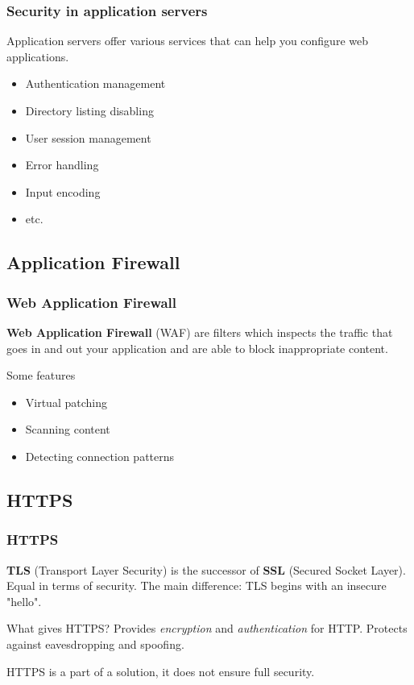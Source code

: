 \begin{frame}
\frametitle{Security in application servers}
Application servers offer various services that can help you configure
web applications.

\begin{itemize}
\item Authentication management
\item Directory listing disabling
\item User session management
\item Error handling
\item Input encoding
\item etc.
\end{itemize}
\end{frame}

\subsection{Application Firewall}

\begin{frame}
\frametitle{Web Application Firewall}
\textbf{Web Application Firewall} (WAF) are filters which inspects the traffic
that goes in and out your application and are able to block inappropriate
content.

\begin{block}{Some features}
\begin{itemize}
\item Virtual patching
\item Scanning content
\item Detecting connection patterns
\end{itemize}
\end{block}
\end{frame}

\subsection{HTTPS}

\begin{frame}
\frametitle{HTTPS}
\textbf{TLS} (Transport Layer Security) is the successor of \textbf{SSL}
(Secured Socket Layer).
Equal in terms of security.
The main difference: TLS begins with an insecure "hello".
\begin{block}{What gives HTTPS?}
Provides \emph{encryption} and \emph{authentication} for HTTP.
\newline Protects against eavesdropping and spoofing.
\end{block}
\vspace{1em}
HTTPS is a part of a solution, it does not ensure full security.
\end{frame}

